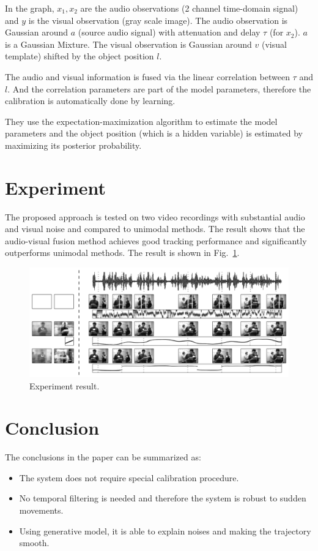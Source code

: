 \documentclass[11pt,a4paper]{article}
\begin{document}
In the graph, $x_1, x_2$ are the audio observations (2 channel time-domain signal) and $y$ is the visual observation (gray scale image).
The audio observation is Gaussian around $a$ (source audio signal) with attenuation and delay $\tau$ (for $x_2$). $a$ is a Gaussian Mixture. The visual observation is Gaussian around $v$ (visual template) shifted by the object position $l$.

The audio and visual information is fused via the linear correlation between $\tau$ and $l$. And the correlation parameters are part of the model parameters, therefore the calibration is automatically done by learning.

They use the expectation-maximization algorithm to estimate the model parameters and the object position (which is a hidden variable) is estimated by maximizing its posterior probability.

\section{Experiment}

The proposed approach is tested on two video recordings with substantial audio and visual noise and compared to unimodal methods. The result shows that the audio-visual fusion method achieves good tracking performance and significantly outperforms unimodal methods. The result is shown in Fig.~\ref{fig:result}.

\begin{figure}
  \centering
  \includegraphics[width=.8\textwidth]{result}
  \caption{Experiment result.}
  \label{fig:result}
\end{figure}

\section{Conclusion}

The conclusions in the paper can be summarized as:

\begin{itemize}
  \item The system does not require special calibration procedure.
  \item No temporal filtering is needed and therefore the system is robust to sudden movements.
  \item Using generative model, it is able to explain noises and making the trajectory smooth.
\end{itemize}
\end{document}
